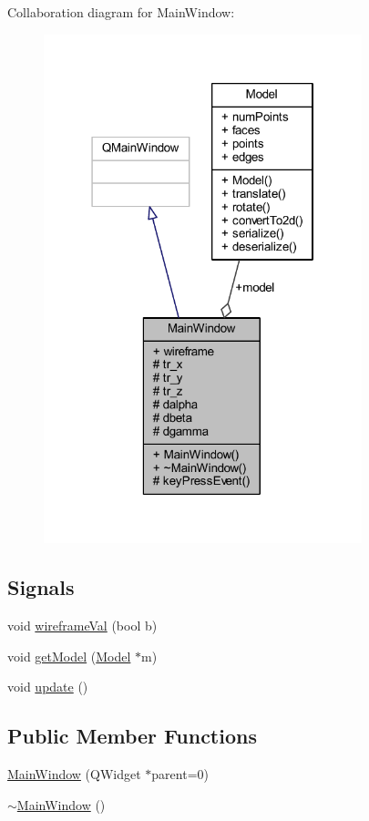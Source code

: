 Collaboration diagram for Main\+Window\+:\nopagebreak
\begin{figure}[H]
\begin{center}
\leavevmode
\includegraphics[width=262pt]{class_main_window__coll__graph}
\end{center}
\end{figure}
\subsection*{Signals}
\begin{DoxyCompactItemize}
\item 
void \mbox{\hyperlink{class_main_window_a482b2d965f153134f11f834fcd28fed5}{wireframe\+Val}} (bool b)
\item 
void \mbox{\hyperlink{class_main_window_a9bd4c07ced537631f1e93c8b5888e78d}{get\+Model}} (\mbox{\hyperlink{class_model}{Model}} $\ast$m)
\item 
void \mbox{\hyperlink{class_main_window_a128f71880d4b9683149023fc46fcc9f8}{update}} ()
\end{DoxyCompactItemize}
\subsection*{Public Member Functions}
\begin{DoxyCompactItemize}
\item 
\mbox{\hyperlink{class_main_window_a8b244be8b7b7db1b08de2a2acb9409db}{Main\+Window}} (Q\+Widget $\ast$parent=0)
\item 
\mbox{\hyperlink{class_main_window_ae98d00a93bc118200eeef9f9bba1dba7}{$\sim$\+Main\+Window}} ()
\end{DoxyCompactItemize}
